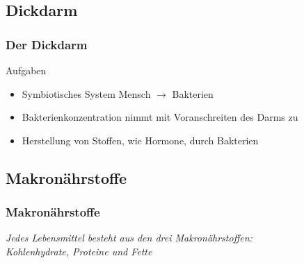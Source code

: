 \documentclass[xcolor=dvipsnames]{beamer}
\begin{document}
    \subsection{Dickdarm}
    \begin{frame}
        \frametitle{Der Dickdarm}

        \begin{block}{Aufgaben}
            \begin{itemize}
                \setlength\itemsep{1em}
                \item Symbiotisches System Mensch $\rightarrow$ Bakterien
                \item Bakterienkonzentration nimmt mit Voranschreiten des Darms zu
                \item Herstellung von Stoffen, wie Hormone, durch Bakterien
            \end{itemize}
        \end{block}
    \end{frame}

    \subsection{Makronährstoffe}
    \begin{frame}
        \frametitle{Makronährstoffe}

        \begin{center}
            \textit{Jedes Lebensmittel besteht aus den drei Makronährstoffen:\\ Kohlenhydrate, Proteine und Fette}
        \end{center}
    \end{frame}
\end{document}
